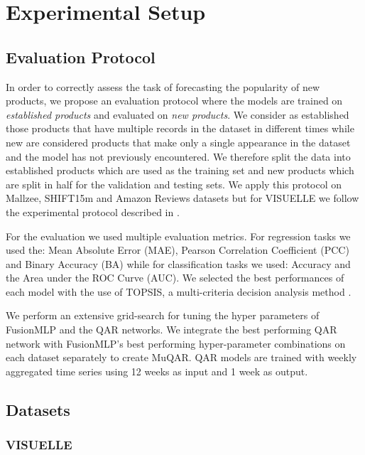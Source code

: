 \documentclass{article}
\begin{document}
\section{Experimental Setup}
\label{section:experimental_setup}
\subsection{Evaluation Protocol}
\label{section:evaluation}
In order to correctly assess the task of forecasting the popularity of new products, we propose an evaluation protocol where the models are trained on \textit{established products} and evaluated on \textit{new products}. We consider as established those products that have multiple records in the dataset in different times while new are considered products that make only a single appearance in the dataset and the model has not previously encountered. We therefore split the data into established products which are used as the training set and new products which are split in half for the validation and testing sets. We apply this protocol on Mallzee, SHIFT15m and Amazon Reviews datasets but for VISUELLE we follow the experimental protocol described in \cite{skenderi2021well}. 

For the evaluation we used multiple evaluation metrics. For regression tasks we used the: Mean Absolute Error (MAE), Pearson Correlation Coefficient (PCC) and Binary Accuracy (BA) while for classification tasks we used: Accuracy and the Area under the ROC Curve (AUC). We selected the best performances of each model with the use of TOPSIS, a multi-criteria decision analysis method \cite{hwang1981methods}. 

We perform an extensive grid-search for tuning the hyper parameters of FusionMLP and the QAR networks. 
We integrate the best performing QAR network with FusionMLP's best performing hyper-parameter combinations on each dataset separately to create MuQAR.
QAR models are trained with weekly aggregated time series using 12 weeks as input and 1 week as output.

\subsection{Datasets}
\label{section:datasets}

\subsubsection{\textbf{VISUELLE}}
\end{document}
